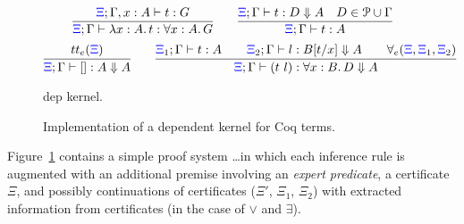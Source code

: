 \begin{footnotesize}
\begin{figure}
    \newcommand{\XXi}{{\color{blue}{\Xi}}}

  \newcommand{\bc}[5]{#1;#2\vdash #3 : #4 \Downarrow #5}
\[
\infer{\XXi;\Gamma\vdash \lambda x:A.\,t : \forall x : A.\,  G}
{\XXi;\Gamma, x : A\vdash t : G%
}
\qquad
\infer{\XXi;\Gamma\vdash t : A}
      {\bc{\XXi}{\Gamma} t D A \quad D \in \Pscr\cup\Gamma}
\]
\vskip -18pt
\[
  \infer{\bc {\XXi}{\Gamma} {[]} A A}{\trueExpert{\XXi}}{}\qquad
  \infer{\bc{\XXi}{\Gamma}{(t\ l)} {\forall x:B.\, D} A}
  {\XXi_1;\Gamma\vdash t : A\qquad \bc{\XXi_2}{\Gamma}l {B[t/x]} A\qquad\prodExpert{\XXi}{\XXi_1}{\XXi_2}}{}
\]
%
\caption{dep kernel.}
\label{fig:augmented}
\end{figure}
\begin{figure}
%

\caption{Implementation of a  dependent kernel for Coq terms.}
\label{fig:kernel}
\end{figure}
\end{footnotesize}



Figure~\ref{fig:augmented} contains a simple proof system \dots  in which each inference rule is augmented with an
additional premise involving an \emph{expert predicate}, a
certificate $\Xi$, and possibly continuations of certificates ($\Xi'$,
$\Xi_1$, $\Xi_2$) with extracted information from certificates (in the
case of $\vee$ and $\exists$).
%
%
%

